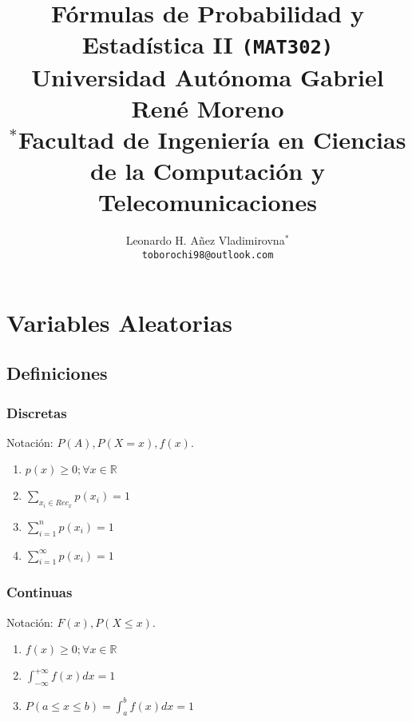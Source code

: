 \documentclass[10pt,letterpaper]{article}
\author{Leonardo H. Añez Vladimirovna$^\ast$\\
\texttt{toborochi98@outlook.com}
}
\title{Fórmulas de Probabilidad y Estadística II \texttt{(MAT302)}\\{\normalsize Universidad Autónoma Gabriel René Moreno}\\{\normalsize $^\ast$Facultad de Ingeniería en Ciencias de la Computación y Telecomunicaciones}}
\begin{document}
\maketitle

\section{Variables Aleatorias}
\subsection{Definiciones}
\begin{multicols}{2}
\subsubsection{Discretas}
\begin{flushleft}
Notación:  $P(A),P(X=x),f(x)$.
\begin{enumerate}
\item $p(x)\geq 0 ; \forall x \in \mathbb{R}$
\item $\displaystyle\sum_{x_i\in Rec_x} p(x_i)=1$
\item $\displaystyle\sum_{i=1}^{n} p(x_i)=1$
\item $\displaystyle\sum_{i=1}^{\infty} p(x_i)=1$
\end{enumerate}
\end{flushleft}
\columnbreak
\subsubsection{Continuas}
\begin{flushleft}
Notación:  $F(x),P(X\leq x)$.
\begin{enumerate}
\item $f(x)\geq 0;\forall x \in \mathbb{R}$
\item $\displaystyle\int_{-\infty}^{+\infty} f(x)dx = 1$
\item $P(a\leq x \leq b) = \displaystyle\int_{a}^{b} f(x)dx=1$
\end{enumerate}
\end{flushleft}
\end{multicols}
\end{document}
